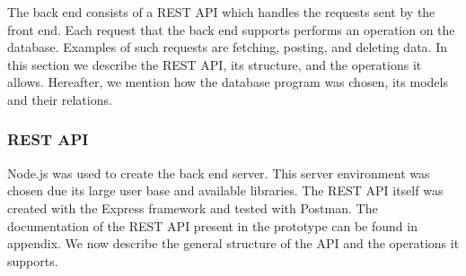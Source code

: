     The back end consists of a REST API which handles the requests sent by the front end. Each request that the back end supports performs an operation on the database. Examples of such requests are fetching, posting, and deleting data. In this section we describe the REST API, its structure, and the operations it allows. Hereafter, we mention how the database program was chosen, its models and their relations.

        \subsubsection{REST API}

        Node.js was used to create the back end server. This server environment was chosen due its large user base and available libraries. The REST API itself was created with the Express framework and tested with Postman. The documentation of the REST API present in the prototype can be found in appendix. We now describe the general structure of the API and the operations it supports.

